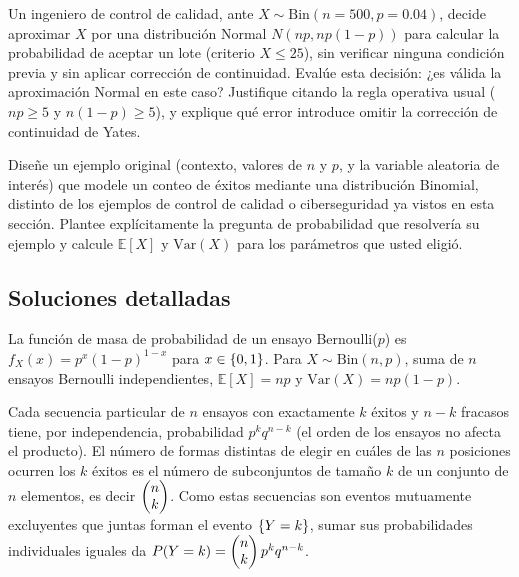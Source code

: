 \begin{problema}
	\label{prob:19f50da}
	Un ingeniero de control de calidad, ante $X \sim \text{Bin}(n=500, p=0.04)$, decide aproximar $X$ por una distribución Normal $N(np, np(1-p))$ para calcular la probabilidad de aceptar un lote (criterio $X \le 25$), sin verificar ninguna condición previa y sin aplicar corrección de continuidad. Evalúe esta decisión: ¿es válida la aproximación Normal en este caso? Justifique citando la regla operativa usual ($np \ge 5$ y $n(1-p) \ge 5$), y explique qué error introduce omitir la corrección de continuidad de Yates.
\end{problema}

\begin{problema}
	\label{prob:3c14103}
	Diseñe un ejemplo original (contexto, valores de $n$ y $p$, y la variable aleatoria de interés) que modele un conteo de éxitos mediante una distribución Binomial, distinto de los ejemplos de control de calidad o ciberseguridad ya vistos en esta sección. Plantee explícitamente la pregunta de probabilidad que resolvería su ejemplo y calcule $\mathbb{E}[X]$ y $\text{Var}(X)$ para los parámetros que usted eligió.
\end{problema}

\subsection*{Soluciones detalladas}

\begin{solproblema}[prob:71ce5a0]
	La función de masa de probabilidad de un ensayo Bernoulli($p$) es $f_X(x) = p^x(1-p)^{1-x}$ para $x \in \left\{ 0,1 \right\}$. Para $X \sim \text{Bin}(n,p)$, suma de $n$ ensayos Bernoulli independientes, $\mathbb{E}[X] = np$ y $\text{Var}(X) = np(1-p)$.
\end{solproblema}

\begin{solproblema}[prob:1149be6]
	Cada secuencia particular de $n$ ensayos con exactamente $k$ éxitos y $n-k$ fracasos tiene, por independencia, probabilidad $p^k q^{n-k}$ (el orden de los ensayos no afecta el producto). El número de formas distintas de elegir en cuáles de las $n$ posiciones ocurren los $k$ éxitos es el número de subconjuntos de tamaño $k$ de un conjunto de $n$ elementos, es decir $\begin{pmatrix} n \\ k\end{pmatrix}$. Como estas secuencias son eventos mutuamente excluyentes que juntas forman el evento $\left\{ Y=k \right\}$, sumar sus probabilidades individuales iguales da $P(Y=k) = \begin{pmatrix} n \\ k\end{pmatrix}p^k q^{n-k}$.
\end{solproblema}


